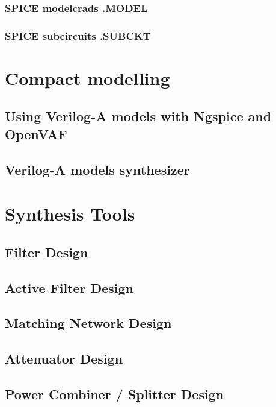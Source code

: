 \documentclass[a4paper,12pt]{article}
\begin{document}
\subsubsection{SPICE modelcrads .MODEL}

\subsubsection{SPICE subcircuits .SUBCKT}

\section{Compact modelling}

\subsection{Using Verilog-A models with Ngspice and OpenVAF}

\subsection{Verilog-A models synthesizer}

\section{Synthesis Tools}
	\subsection{Filter Design}
	\subsection{Active Filter Design}
	\subsection{Matching Network Design}
	\clearpage
	\subsection{Attenuator Design}
		
	\clearpage
	\subsection{Power Combiner / Splitter Design}
	
\clearpage


\end{document}
